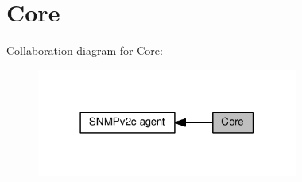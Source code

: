 \hypertarget{group__snmp__core}{}\section{Core}
\label{group__snmp__core}
Collaboration diagram for Core\+:
\nopagebreak
\begin{figure}[H]
\begin{center}
\leavevmode
\includegraphics[width=243pt]{group__snmp__core}
\end{center}
\end{figure}
